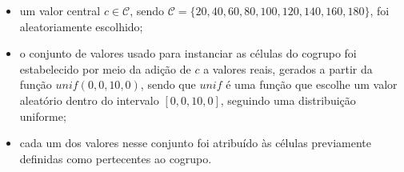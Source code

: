 \documentclass[
    12pt,                %
    oneside,            %
    a4paper,            %
    english,            %
    brazil                %
    ]{abntex2ppgsi}
\begin{document}


\begin{itemize}
\item um valor central $c \in \mathcal{C}$, sendo $\mathcal{C} = \{ 20, 40, 60, 80, 100, 120, 140, 160, 180 \}$, foi aleatoriamente escolhido;
\item o conjunto de valores usado para instanciar as células do cogrupo foi estabelecido por meio da adição de $c$ a valores reais, gerados a partir da função $unif(0,0, 10,0)$, sendo que $unif$ é uma função que escolhe um valor aleatório dentro do intervalo $[0,0,10,0]$, seguindo uma distribuição uniforme;
\item  cada um dos valores nesse conjunto foi atribuído às células previamente definidas como pertecentes ao cogrupo.
\end{itemize}

\end{document}
